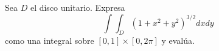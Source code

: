 Sea \( D \) el disco unitario. Expresa
\[
\int\int_D (1 + x^2 + y^2)^{3/2} dxdy
\]
como una integral sobre \([0, 1] \times [0, 2\pi]\) y evalúa.
